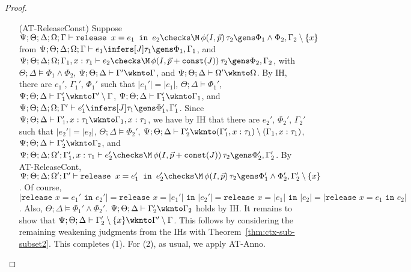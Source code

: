 \begin{proof}
\begin{itemize}
  \item[(AT-ReleaseConst)] Suppose
  $\Psi ; \Theta ; \Delta ; \Omega ; \Gamma \vdash \texttt{release } x = e_1 \texttt{ in }e_2 \checks \M \, \phi(I,\vec{p}) \, \tau_2 \gens \Phi_1 \wedge \Phi_2, \Gamma_2 \setminus \{x\}$ from
  $\Psi ; \Theta ; \Delta ; \Omega ; \Gamma \vdash e_1 \infers [J] \tau_1 \gens \Phi_1,\Gamma_1$, and
  $\Psi ; \Theta ; \Delta ; \Omega ; \Gamma_1, x : \tau_1 \vdash e_2 \checks \M \, \phi(I,\vec{p} + \texttt{const}(J)) \, \tau_2 \gens \Phi_2, \Gamma_2$, with
  $\Theta ; \Delta \vDash \Phi_1 \wedge \Phi_2$,
  $\Psi ; \Theta ; \Delta \vdash \Gamma' \wknto \Gamma$, and
  $\Psi ; \Theta ; \Delta \vdash \Omega' \wknto \Omega$.
  By IH, there are $e_1'$, $\Gamma_1'$, $\Phi_1'$ such that
  $|e_1'| = |e_1|$,
  $\Theta ; \Delta \vDash \Phi_1'$,
  $\Psi ; \Theta ; \Delta \vdash \Gamma_1' \wknto \Gamma' \setminus \Gamma$,
  $\Psi ; \Theta ; \Delta \vdash \Gamma_1' \wknto \Gamma_1$, and
  $\Psi ; \Theta ; \Delta ; \Omega ; \Gamma' \vdash e_1' \infers [J]\tau_1 \gens \Phi_1',\Gamma_1'$.
  Since $\Psi ; \Theta ; \Delta \vdash \Gamma_1',x : \tau_1 \wknto \Gamma_1, x : \tau_1$,
  we have by IH that there are $e_2'$, $\Phi_2'$, $\Gamma_2'$ such that
  $|e_2'| = |e_2|$,
  $\Theta ; \Delta \vDash \Phi_2'$,
  $\Psi ; \Theta ; \Delta \vdash \Gamma_2' \wknto (\Gamma_1',x : \tau_1) \setminus (\Gamma_1, x : \tau_1)$,
  $\Psi ; \Theta ; \Delta \vdash \Gamma_2' \wknto \Gamma_2$, and
  $\Psi ; \Theta ; \Delta ; \Omega' ; \Gamma_1', x : \tau_1 \vdash e_2' \checks \M \, \phi(I,\vec{p} + \texttt{const}(J)) \, \tau_2 \gens \Phi_2', \Gamma_2'$.
  By AT-ReleaseCont,
  $\Psi ; \Theta ; \Delta ; \Omega' ; \Gamma' \vdash \texttt{release } x = e_1' \texttt{ in }e_2' \checks \M \, \phi(I,\vec{p}) \, \tau_2 \gens \Phi_1' \wedge \Phi_2', \Gamma_2' \setminus \{x\}$.
  Of course, $|\texttt{release } x = e_1' \texttt{ in }e_2'| = \texttt{release } x = |e_1'| \texttt{ in }|e_2'| = \texttt{release } x = |e_1| \texttt{ in }|e_2|
  = |\texttt{release } x = e_1 \texttt{ in }e_2|$.
  Also, $\Theta ; \Delta \vDash \Phi_1' \wedge \Phi_2'$.
  $\Psi ; \Theta ; \Delta \vdash \Gamma_2' \wknto \Gamma_2$ holds by IH.
  It remains to show that $\Psi ; \Theta ; \Delta \vdash \Gamma_2' \setminus \{x\} \wknto \Gamma' \setminus \Gamma$.
  This follows by considering the remaining weakening judgments from the IHs with Theorem~\ref{thm:ctx-sub-subset2}.
  This completes (1). For (2), as usual, we apply AT-Anno.
  

\end{itemize}
\end{proof}
